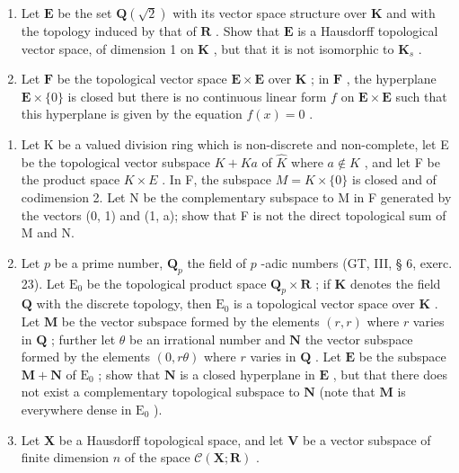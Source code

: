 \begin{enumerate}
\def\labelenumi{\alph{enumi})}
\item
  Let \(\mathbf{E}\) be the set \(\mathbf{Q}(\sqrt{2})\) with its vector space structure over \(\mathbf{K}\) and with the topology induced by that of \(\mathbf{R}\) . Show that \(\mathbf{E}\) is a Hausdorff topological vector space, of dimension 1 on \(\mathbf{K}\) , but that it is not isomorphic to \(\mathbf{K}_s\) .
\item
  Let \(\mathbf{F}\) be the topological vector space \(\mathbf{E} \times \mathbf{E}\) over \(\mathbf{K}\) ; in \(\mathbf{F}\) , the hyperplane \(\mathbf{E} \times \{0\}\) is closed but there is no continuous linear form \(f\) on \(\mathbf{E} \times \mathbf{E}\) such that this hyperplane is given by the equation \(f(x) = 0\) .
\end{enumerate}

\begin{enumerate}
\def\labelenumi{\arabic{enumi})}
\setcounter{enumi}{6}
\item
  Let K be a valued division ring which is non-discrete and non-complete, let E be the topological vector subspace \(K + Ka\) of \(\hat{K}\) where \(a \notin K\) , and let F be the product space \(K \times E\) . In F, the subspace \(M = K \times \{0\}\) is closed and of codimension 2. Let N be the complementary subspace to M in F generated by the vectors (0, 1) and (1, a); show that F is not the direct topological sum of M and N.
\item
  Let \(p\) be a prime number, \(\mathbf{Q}_p\) the field of \(p\) -adic numbers (GT, III, § 6, exerc. 23). Let \(\mathrm{E}_0\) be the topological product space \(\mathbf{Q}_p \times \mathbf{R}\) ; if \(\mathbf{K}\) denotes the field \(\mathbf{Q}\) with the discrete topology, then \(\mathrm{E}_0\) is a topological vector space over \(\mathbf{K}\) . Let \(\mathbf{M}\) be the vector subspace formed by the elements \((r, r)\) where \(r\) varies in \(\mathbf{Q}\) ; further let \(\theta\) be an irrational number and \(\mathbf{N}\) the vector subspace formed by the elements \((0, r\theta)\) where \(r\) varies in \(\mathbf{Q}\) . Let \(\mathbf{E}\) be the subspace \(\mathbf{M} + \mathbf{N}\) of \(\mathrm{E}_0\) ; show that \(\mathbf{N}\) is a closed hyperplane in \(\mathbf{E}\) , but that there does not exist a complementary topological subspace to \(\mathbf{N}\) (note that \(\mathbf{M}\) is everywhere dense in \(\mathrm{E}_0\) ).
\item
  Let \(\mathbf{X}\) be a Hausdorff topological space, and let \(\mathbf{V}\) be a vector subspace of finite dimension \(n\) of the space \(\mathcal{C}(\mathbf{X};\mathbf{R})\) .
\end{enumerate}

